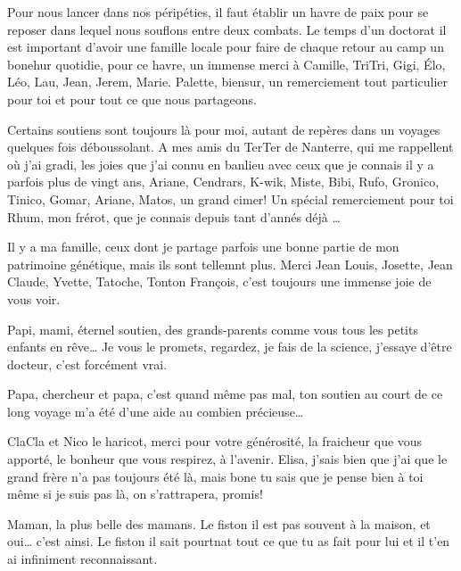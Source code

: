 Pour nous lancer dans nos péripéties, il faut établir un havre de paix
pour se reposer dans lequel nous souflons entre deux combats. Le temps
d'un doctorat il est important d'avoir une famille locale pour faire de
chaque retour au camp un bonehur quotidie, pour ce havre, un immense
merci à Camille, TriTri, Gigi, Élo, Léo, Lau, Jean, Jerem, Marie.
Palette, biensur, un remerciement tout particulier pour toi et pour tout
ce que nous partageons.

Certains soutiens sont toujours là pour moi, autant de repères dans un
voyages quelques fois déboussolant. A mes amis du TerTer de Nanterre,
qui me rappellent où j'ai gradi, les joies que j'ai connu en banlieu
avec ceux que je connais il y a parfois plus de vingt ans, Ariane,
Cendrars, K-wik, Miste, Bibi, Rufo, Gronico, Tinico, Gomar, Ariane,
Matos, un grand cimer! Un spécial remerciement pour toi Rhum, mon
frérot, que je connais depuis tant d'annés déjà \ldots{}

Il y a ma famille, ceux dont je partage parfois une bonne partie de mon
patrimoine génétique, mais ils sont tellemnt plus. Merci Jean Louis,
Josette, Jean Claude, Yvette, Tatoche, Tonton François, c'est toujours
une immense joie de vous voir.

Papi, mami, éternel soutien, des grands-parents comme vous tous les
petits enfants en rêve\ldots{} Je vous le promets, regardez, je fais de
la science, j'essaye d'être docteur, c'est forcément vrai.

Papa, chercheur et papa, c'est quand même pas mal, ton soutien au court
de ce long voyage m'a été d'une aide au combien précieuse\ldots{}

ClaCla et Nico le haricot, merci pour votre générosité, la fraicheur que
vous apporté, le bonheur que vous respirez, à l'avenir. Elisa, j'sais
bien que j'ai que le grand frère n'a pas toujours été là, mais bone tu
sais que je pense bien à toi même si je suis pas là, on s'rattrapera,
promis!

Maman, la plus belle des mamans. Le fiston il est pas souvent à la
maison, et oui\ldots{} c'est ainsi. Le fiston il sait pourtnat tout ce
que tu as fait pour lui et il t'en ai infiniment reconnaissant.
